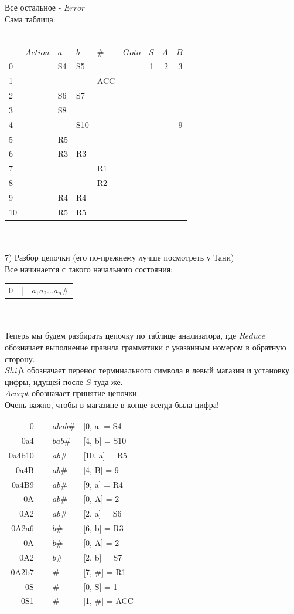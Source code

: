 \documentclass[14pt]{extreport}
\begin{document}
	Все остальное - $Error$\\
	\newpage
	Сама таблица:\\\\
	\begin{tabular}{lllllrrrr}
		& $Action$ & $a$ & $b$ & $\#$ & $Goto$ & $S$ & $A$ & $B$ \\
		0 && S4 & S5 &&& 1 & 2 & 3\\
		1 &&&& ACC\\
		2 && S6 & S7\\
		3 && S8\\
		4 &&& S10 &&&&& 9\\
		5 && R5\\
		6 && R3 & R3\\
		7 &&&& R1\\
		8 &&&& R2\\
		9 && R4 & R4\\
		10 && R5 & R5\\
	\end{tabular}\\\\
	7) Разбор цепочки (его по-прежнему лучше посмотреть у Тани)\\
	Все начинается с такого начального состояния:\\
	\begin{tabular}{rcl}
		0 & | & $a_1a_2...a_n\#$
	\end{tabular}\\\\
	Теперь мы будем разбирать цепочку по таблице анализатора, где
	$Reduce$ обозначает выполнение правила грамматики с указанным номером в обратную сторону.\\
	$Shift$ обозначает перенос терминального символа в левый магазин и установку цифры,
	идущей после $S$ туда же.\\
	$Accept$ обозначает принятие цепочки.\\
	Очень важно, чтобы в магазине в конце всегда была цифра!\\
	\begin{tabular}{rcll}
		0 & | & $abab\#$ & [0, a] = S4\\
		0a4 & | & $bab\#$ & [4, b] = S10\\
		0a4b10 & | & $ab\#$ & [10, a] = R5\\
		0a4B & | & $ab\#$ & [4, B] = 9\\
		0a4B9 & | & $ab\#$ & [9, a] = R4\\
		0A & | & $ab\#$ & [0, A] = 2\\
		0A2 & | & $ab\#$ & [2, a] = S6\\
		0A2a6 & | & $b\#$ & [6, b] =  R3\\
		0A & | & $b\#$ & [0, A] = 2\\
		0A2 & | & $b\#$ & [2, b] = S7\\
		0A2b7 & | & $\#$ & [7, $\#$] = R1\\
		0S & | & $\#$ & [0, S] = 1\\
		0S1 & | & $\#$ & [1, $\#$] = ACC
	\end{tabular}\\\\
\end{document}

